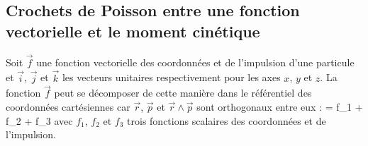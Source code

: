 \subsection{Crochets de Poisson entre une fonction vectorielle et le moment cin\'{e}tique}\label{PAR:42_EX4}

Soit $\vec{f}$ une fonction vectorielle des coordonn\'{e}es et de l'impulsion d'une particule et $\vec{i}$, $\vec{j}$ et $\vec{k}$ les vecteurs unitaires respectivement pour les axes $x$, $y$ et $z$. La fonction $\vec{f}$ peut se d\'{e}composer de cette mani\`{e}re dans le r\'{e}f\'{e}rentiel des coordonn\'{e}es cart\'{e}siennes car $\vec{r}$, $\vec{p}$ et $\vec{r}\wedge\vec{p}$ sont orthogonaux entre eux :
\benn
	 = f_{1} + f_{2} + f_{3}\wedge{}
\eenn
avec $f_{1}$, $f_{2}$ et $f_{3}$ trois fonctions scalaires des coordonn\'{e}es et de l'impulsion.

